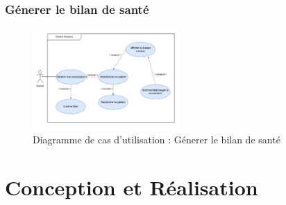 \documentclass[a4paper]{report}
\begin{document}
\subsection{Génerer le bilan de santé}
\begin{figure}[H]
    \vspace{-10pt}
    \centering
    \includegraphics[width=0.5\textwidth]{besoins/bilan-sante.png}
    \caption{Diagramme de cas d'utilisation : Génerer le bilan de santé}
    \label{fig:DCU8}
\end{figure}


\chapter{Conception et Réalisation}
\end{document}

